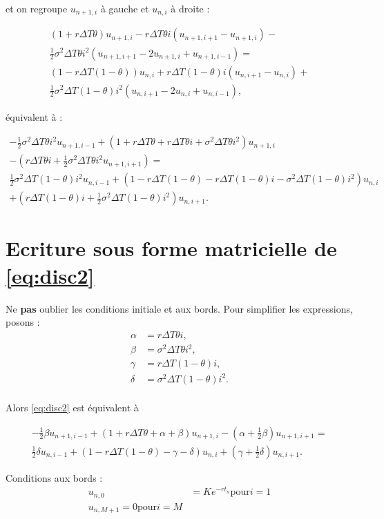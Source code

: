 \documentclass[a4paper, 11pt]{article}
\renewcommand{\(}{\left (}
\renewcommand{\)}{\right )}
\newcommand{\uni}[2]{u_{{#1},{#2}}}
\begin{document}
et on regroupe $\uni{n + 1}{i}$ \`a gauche et $\uni{n}{i}$ \`a droite
:

\begin{multline}
  (1+r\Delta T\theta)\uni{n+1}{i} - r\Delta T\theta i(\uni{n+1}{i+1} -
  \uni{n+1}{i}) - \\
  \frac{1}{2}\sigma^2\Delta T\theta i^2 (\uni{n+1}{i+1} -2\uni{n+1}{i}
  + \uni{n+1}{i - 1}) = \\
  (1-r\Delta T(1-\theta))\uni{n}{i} + r\Delta T(1-\theta) i(\uni{n}{i+1} -
  \uni{n}{i}) + \\
  \frac{1}{2}\sigma^2\Delta T(1-\theta) i^2 (\uni{n}{i+1} -2\uni{n}{i}
  + \uni{n}{i - 1}),
\end{multline}

\'equivalent \`a :

\begin{multline}
  \label{eq:disc2}
  -\frac{1}{2}\sigma^2\Delta T\theta i^2\uni{n+1}{i - 1} + (1+r\Delta
  T\theta +r\Delta T\theta i + \sigma^2\Delta T\theta i^2)\uni{n+1}{i}
  \\
  - (r\Delta T\theta i + \frac{1}{2}\sigma^2\Delta T\theta
  i^2\uni{n+1}{i + 1}) = \\
  \frac{1}{2}\sigma^2\Delta T(1-\theta) i^2\uni{n}{i - 1} + (1-r\Delta
  T(1-\theta) -r\Delta T(1-\theta) i - \sigma^2\Delta T(1-\theta)
  i^2)\uni{n}{i} \\
  + (r\Delta T(1-\theta) i + \frac{1}{2}\sigma^2\Delta T(1-\theta)
  i^2)\uni{n}{i + 1}.
\end{multline}

\section{Ecriture sous forme matricielle de \eqref{eq:disc2}}

Ne \textbf{pas} oublier les conditions initiale et aux bords. Pour
simplifier les expressions, posons :
\begin{align*}
  \alpha & = r\Delta T\theta i,\\
  \beta  & = \sigma^2\Delta T\theta i^2, \\
  \gamma & = r\Delta T(1 - \theta) i,\\
  \delta & = \sigma^2\Delta T(1-\theta) i^2. \\
\end{align*}

Alors \eqref{eq:disc2} est \'equivalent \`a

\begin{multline}
  \label{eq:disc2}
  -\frac{1}{2}\beta\uni{n+1}{i - 1} + (1+r\Delta
  T\theta + \alpha + \beta)\uni{n+1}{i}
  - \(\alpha + \frac{1}{2}\beta\)\uni{n+1}{i + 1} = \\
  \frac{1}{2}\delta\uni{n}{i - 1} + (1-r\Delta
  T(1-\theta) - \gamma - \delta)\uni{n}{i}
  + \(\gamma + \frac{1}{2}\delta\)\uni{n}{i + 1}.
\end{multline}

Conditions aux bords :
\begin{align*}
  \uni{n}{0} & = Ke^{-rt_n} \mathrm{pour} i = 1 \\
  \uni{n}{M+1} = 0 \mathrm{pour} i = M
\end{align*}
\end{document}
